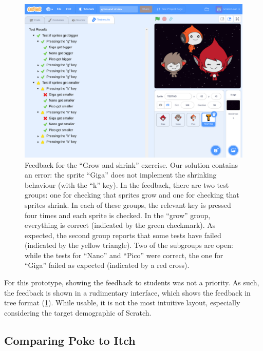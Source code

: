 \documentclass[../main]{subfiles}
\begin{document}
\begin{figure}
\begin{wide}
    \includegraphics[width=\linewidth]{scratch-poke-feedback}
\end{wide}
\caption{
    Feedback for the ``Grow and shrink'' exercise.
    Our solution contains an error: the sprite ``Giga'' does not implement the shrinking behaviour (with the ``k'' key).
    In the feedback, there are two test groups: one for checking that sprites grow and one for checking that sprites shrink.
    In each of these groups, the relevant key is pressed four times and each sprite is checked.
    In the ``grow'' group, everything is correct (indicated by the green checkmark).
    As expected, the second group reports that some tests have failed (indicated by the yellow triangle).
    Two of the subgroups are open: while the tests for ``Nano'' and ``Pico'' were correct, the one for ``Giga'' failed as expected (indicated by a red cross).
}
\label{fig:poke-feedback-result}
\end{figure}

For this prototype, showing the feedback to students was not a priority.
As such, the feedback is shown in a rudimentary interface, which shows the feedback in tree format (\cref{fig:poke-feedback-result}).
While usable, it is not the most intuitive layout, especially considering the target demographic of Scratch.

\subsection{Comparing Poke to Itch}\label{subsec:comparing-poke-to-itch}
\end{document}
